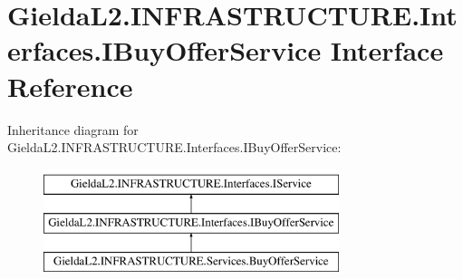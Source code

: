 \hypertarget{interface_gielda_l2_1_1_i_n_f_r_a_s_t_r_u_c_t_u_r_e_1_1_interfaces_1_1_i_buy_offer_service}{}\section{Gielda\+L2.\+I\+N\+F\+R\+A\+S\+T\+R\+U\+C\+T\+U\+R\+E.\+Interfaces.\+I\+Buy\+Offer\+Service Interface Reference}
\label{interface_gielda_l2_1_1_i_n_f_r_a_s_t_r_u_c_t_u_r_e_1_1_interfaces_1_1_i_buy_offer_service}
Inheritance diagram for Gielda\+L2.\+I\+N\+F\+R\+A\+S\+T\+R\+U\+C\+T\+U\+R\+E.\+Interfaces.\+I\+Buy\+Offer\+Service\+:\begin{figure}[H]
\begin{center}
\leavevmode
\includegraphics[height=3.000000cm]{interface_gielda_l2_1_1_i_n_f_r_a_s_t_r_u_c_t_u_r_e_1_1_interfaces_1_1_i_buy_offer_service}
\end{center}
\end{figure}
